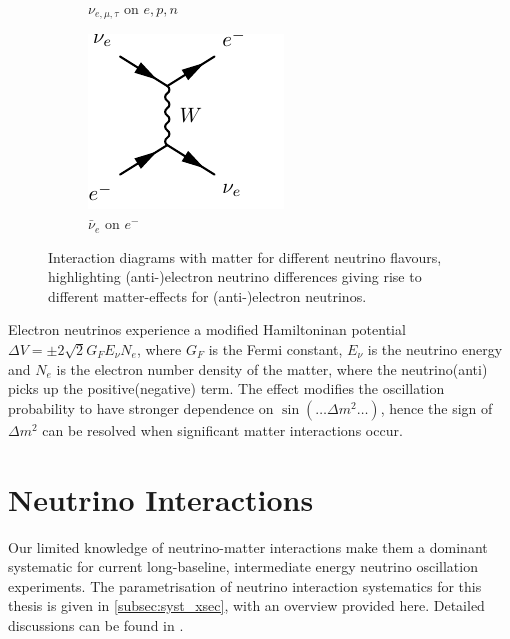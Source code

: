 \begin{figure}[h]
\begin{subfigure}[t]{0.32\textwidth}
		\caption{$\nu_{e,\mu,\tau}$ on $e,p,n$}
	\end{subfigure}
	\begin{subfigure}[t]{0.32\textwidth}
		\centering
		\includegraphics[width=.6\textwidth, trim={0mm 0mm 7mm 0mm}, clip, page=2]{figures/theory/feynmp_crop}
		\caption{$\bar{\nu}_e$ on $e^-$}
	\end{subfigure}
	\caption{Interaction diagrams with matter for different neutrino flavours, highlighting (anti-)electron neutrino differences giving rise to different matter-effects for (anti-)electron neutrinos.}
	\label{fig:msw_effect}
\end{figure}

Electron neutrinos experience a modified Hamiltoninan potential $\Delta V = \pm 2\sqrt{2}G_F E_\nu N_e$, where $G_F$ is the Fermi constant, $E_\nu$ is the neutrino energy and $N_e$ is the electron number density of the matter, where the neutrino(anti) picks up the positive(negative) term. The effect modifies the oscillation probability to have stronger dependence on $\sin \left(\ldots \Delta m^2 \ldots \right)$, hence the sign of $\Delta m^2$ can be resolved when significant matter interactions occur\cite{msw_summary}.

\section{Neutrino Interactions}
\label{sec:theory:int}
Our limited knowledge of neutrino-matter interactions make them a dominant systematic for current long-baseline, intermediate energy neutrino oscillation experiments. The parametrisation of neutrino interaction systematics for this thesis is given in \autoref{subsec:syst_xsec}, with an overview provided here. Detailed discussions can be found in \cite{katori_martini,ulrich_review,nieves_review}.

